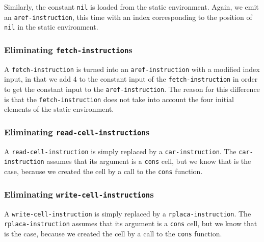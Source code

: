 Similarly, the constant \texttt{nil} is loaded from the static
environment.  Again, we emit an \texttt{aref-instruction}, this time with
an index corresponding to the position of \texttt{nil} in the
static environment.%

\subsubsection{Eliminating \texttt{fetch-instruction}s}

A \texttt{fetch-instruction} is turned into an
\texttt{aref-instruction} with a modified index input, in that we add
$4$ to the constant input of the \texttt{fetch-instruction} in order
to get the constant input to the \texttt{aref-instruction}.  The
reason for this difference is that the \texttt{fetch-instruction} does
not take into account the four initial elements of the static
environment.

\subsubsection{Eliminating \texttt{read-cell-instruction}s}

A \texttt{read-cell-instruction} is simply replaced by a
\texttt{car-instruction}.  The \texttt{car-instruction} assumes that
its argument is a \texttt{cons} cell, but we know that is the case,
because we created the cell by a call to the \texttt{cons} function.

\subsubsection{Eliminating \texttt{write-cell-instruction}s}

A \texttt{write-cell-instruction} is simply replaced by a
\texttt{rplaca-instruction}.  The \texttt{rplaca-instruction} assumes
that its argument is a \texttt{cons} cell, but we know that is the
case, because we created the cell by a call to the \texttt{cons}
function.

